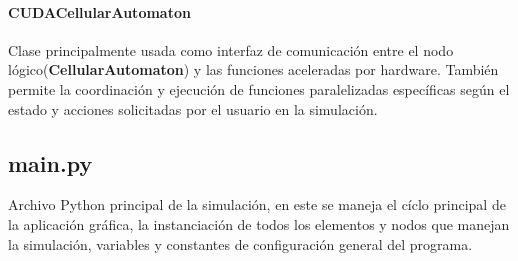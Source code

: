 \documentclass[]{article}
\begin{document}
			\paragraph{CUDACellularAutomaton}
				Clase principalmente usada como interfaz de comunicación entre el nodo lógico(\textbf{CellularAutomaton}) y las funciones aceleradas por hardware. También permite la coordinación y ejecución de funciones paralelizadas específicas según el estado y acciones solicitadas por el usuario en la simulación.
			
			
			
	\subsection{main.py}
		Archivo Python principal de la simulación, en este se maneja el cíclo principal de la aplicación gráfica, la instanciación de todos los elementos y nodos que manejan la simulación, variables y constantes de configuración general del programa.
		
		
\end{document}
